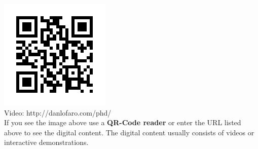 
  \centering
      \includegraphics{./qrcode/qrcode-phd.png}\\
      Video: http://danlofaro.com/phd/ \\
If you see the image above use a \textbf{QR-Code reader} or enter the URL listed above to see the digital content.  The digital content usually consists of videos or interactive demonstrations.

